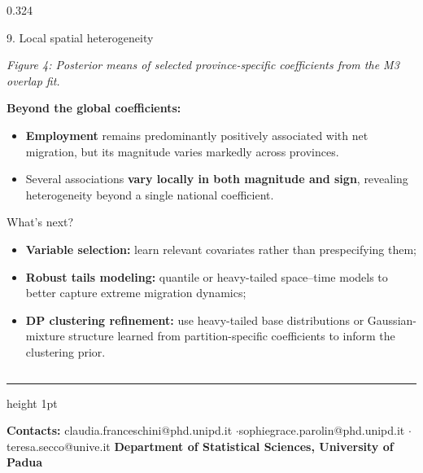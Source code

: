 \documentclass[final]{beamer}
\newcommand{\smallgap}{\vspace{0.25cm}}
\newcommand{\microgap}{\vspace{0.12cm}}
\begin{document}
\begin{frame}[t]
\begin{columns}[t,totalwidth=\textwidth]
\begin{column}{0.324\textwidth}
\begin{block}{9. Local spatial heterogeneity}
\begin{center}
  \parbox{0.96\linewidth}{
  \scriptsize
  \textit{Figure 4: Posterior means of selected province-specific coefficients
 from the M3 overlap fit.}
  }
\end{center}

\microgap
\justifying
\textbf{Beyond the global coefficients:}
\begin{itemize}

  \item \textbf{Employment} remains predominantly positively associated with
  net migration, but its magnitude varies markedly across provinces.

  \item Several associations \textbf{vary locally in both magnitude and sign}, revealing heterogeneity beyond a single national coefficient.

\end{itemize}

\end{block}

\smallgap
\begin{block}{What's next?}
\justifying
\begin{itemize}

\item \textbf{Variable selection:}
learn relevant covariates rather than prespecifying them;

\item \textbf{Robust tails modeling:}
quantile or heavy-tailed space--time models to better capture extreme migration dynamics;

\item \textbf{DP clustering refinement:}
use heavy-tailed base distributions or Gaussian-mixture structure learned from
partition-specific coefficients to inform the clustering prior.

\end{itemize}

\end{block}
\end{column}
\end{columns}


\vfill
\hrule height 1pt
\vspace{0.20cm}

\begin{center}
\footnotesize
\textbf{Contacts:}  claudia.franceschini@phd.unipd.it \quad$\cdot$\quad sophiegrace.parolin@phd.unipd.it \quad$\cdot$\quad teresa.secco@unive.it
\qquad\qquad
\textbf{Department of Statistical Sciences, University of Padua}
\end{center}

\end{frame}
\end{document}
